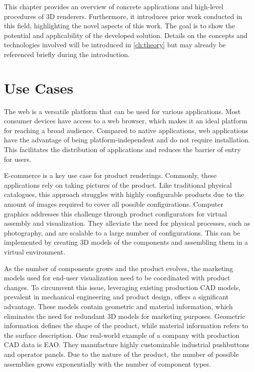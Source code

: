 
This chapter provides an overview of concrete applications and high-level procedures of 3D renderers. Furthermore, it introduces prior work conducted in this field, highlighting the novel aspects of this work. The goal is to show the potential and applicability of the developed solution. Details on the concepts and technologies involved will be introduced in \autoref{ch:theory} but may already be referenced briefly during the introduction.

\section{Use Cases}

The web is a versatile platform that can be used for various applications. Most consumer devices have access to a web browser, which makes it an ideal platform for reaching a broad audience. Compared to native applications, web applications have the advantage of being platform-independent and do not require installation. This facilitates the distribution of applications and reduces the barrier of entry for users.

E-commerce is a key use case for product renderings. Commonly, these applications rely on taking pictures of the product. Like traditional physical catalogues, this approach struggles with highly configurable products due to the amount of images required to cover all possible configurations. Computer graphics addresses this challenge through product configurators for virtual assembly and visualization. They alleviate the need for physical processes, such as photography, and are scalable to a large number of configurations. This can be implemented by creating 3D models of the components and assembling them in a virtual environment.

As the number of components grows and the product evolves, the marketing models used for end-user visualization need to be coordinated with product changes. To circumvent this issue, leveraging existing production \gls{CAD} models, prevalent in mechanical engineering and product design, offers a significant advantage. These models contain geometric and material information, which eliminates the need for redundant 3D models for marketing purposes. Geometric information defines the shape of the product, while material information refers to the surface description. One real-world example of a company with production \gls{CAD} data is EAO. They manufacture highly customizable industrial pushbuttons and operator panels. Due to the nature of the product, the number of possible assemblies grows exponentially with the number of component types.

